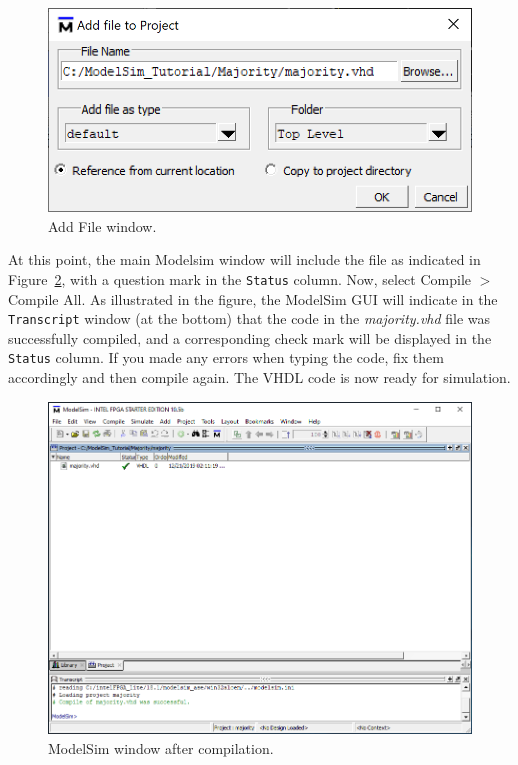 \documentclass[11pt, twoside, pdftex]{article}
\begin{document}
\begin{figure}[H]
   \begin{center}
      \includegraphics[scale=0.75]{figures/add_file.png}
   \caption{Add File window.} 
	 \label{fig:4}
	 \end{center}
\end{figure}

At this point, the main Modelsim window will include the file as indicated in 
Figure~\ref{fig:6}, with a question mark in the \texttt{Status} column. Now, select
{\sf Compile $>$ Compile All}. As illustrated in the figure, the ModelSim GUI will
indicate in the \texttt{Transcript} window (at the bottom) that the code in the {\it majority.vhd}
file was successfully compiled, and a corresponding check mark will be displayed in 
the \texttt{Status} column. If you made any errors when typing the code, fix them accordingly
and then compile again. The VHDL code is now ready for simulation.

\begin{figure}[H]
   \begin{center}
      \includegraphics[width=\textwidth]{figures/compile.png}
   \caption{ModelSim window after compilation.} 
	 \label{fig:6}
	 \end{center}
\end{figure}
\end{document}
